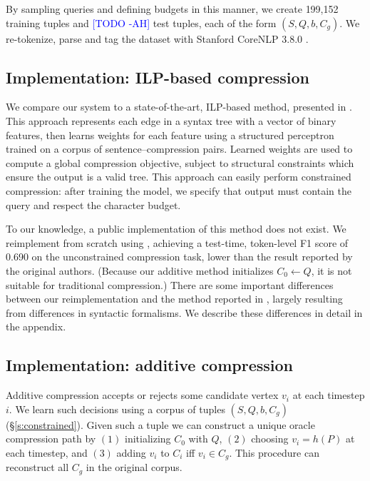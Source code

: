 \documentclass[11pt,a4paper]{article}
\newcommand{\ahcomment}[1]{\textcolor{blue}{[#1 -AH]}}
\begin{document}
By sampling queries and defining budgets in this manner, we create {199,152} training tuples and {\ahcomment{TODO}} test tuples, each of the form $(S,Q,b,C_g)$. We re-tokenize, parse and tag the dataset with Stanford CoreNLP 3.8.0 \cite{corenlp}.

\subsection{Implementation: ILP-based compression}\label{s:ilp}

We compare our system to a state-of-the-art, ILP-based method, presented in \citet{filippova2013overcoming}. This approach represents each edge in a syntax tree with a vector of binary features, then learns weights for each feature using a structured perceptron trained on a corpus of sentence--compression pairs. Learned weights are used to compute a global compression objective, subject to structural constraints which ensure the output is a valid tree. This approach can easily perform constrained compression: after training the model, we specify that output must contain the query and respect the character budget.

To our knowledge, a public implementation of this method does not exist. We reimplement from scratch using \citet{gurobi}, achieving a test-time, token-level F1 score of  0.690 on the unconstrained compression task, lower than the result reported by the original authors. (Because our additive method initializes $C_0 \gets Q$, it is not suitable for traditional compression.) There are some important differences between our reimplementation and the method reported in \citet{filippova2013overcoming}, largely resulting from differences in syntactic formalisms. We describe these differences in detail in the appendix.

\subsection{Implementation: additive compression}\label{s:transition}

Additive compression accepts or rejects some candidate vertex $v_i$ at each timestep $i$. 
We learn such decisions using a corpus of tuples $(S,Q,b,C_g)$ (\S\ref{s:constrained}). Given such a tuple we can construct a unique oracle compression path by $(1)$ initializing $C_0$ with $Q$, $(2)$ choosing $v_i = h(P)$ at each timestep, and $(3)$ adding $v_i$ to $C_i$ iff $v_i \in C_g$. This procedure can reconstruct all $C_g$ in the original \citet{filippova2013overcoming} corpus. 
\end{document}
